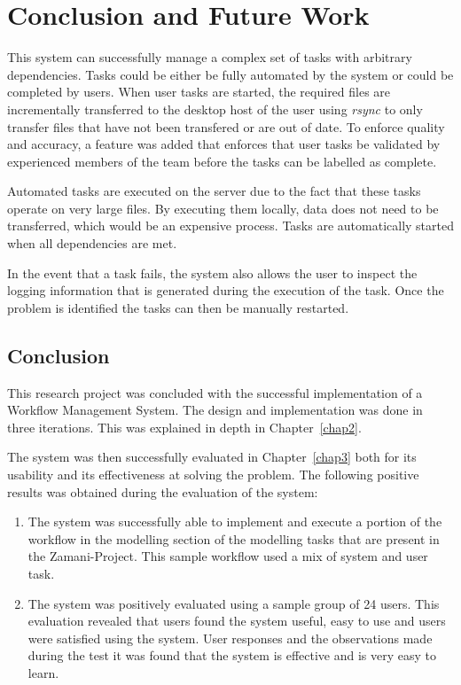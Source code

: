 \chapter{Conclusion and Future Work\label{chap4}}

This system can successfully manage a complex set
of tasks with arbitrary dependencies. Tasks could be either be fully automated
by the system or could be completed by users. When user tasks are started, the
required files are incrementally transferred to the desktop host of the user
using \emph{rsync} to only transfer files that have not been transfered or are
out of date. To enforce quality and accuracy, a feature was added that enforces
that user tasks be validated by experienced members of the team before the tasks
can be labelled as complete.

Automated tasks are executed on the
server due to the fact that these tasks operate on very large files. By executing
them locally, data does not need to be transferred, which would be an expensive
process. Tasks are automatically started when all dependencies are met.

In the event that a task fails, the system also allows the user to inspect the
logging information that is generated during the execution of the task. Once the
problem is identified the tasks can then be manually restarted.

\section{Conclusion}
This research project was concluded with the successful implementation of a
Workflow Management System.  The design and
implementation was done in three iterations. This was explained in depth in
Chapter~\ref{chap2}.


The system was then successfully evaluated in Chapter~\ref{chap3} both for its
usability and its effectiveness at solving the problem. The following positive
results was obtained during the evaluation of the system:
\begin{enumerate}
    \item The system was successfully able to implement and execute a portion of
        the workflow in the modelling section of the modelling tasks that are
        present in the Zamani-Project. This sample workflow used a mix of system
        and user task.
    \item The system was positively evaluated using a sample group of 24 users.
        This evaluation revealed that users found the system useful, easy to
        use and users were satisfied using the system. User responses and the
        observations made during the test it was found that the system is
        effective and is very easy to learn.
\end{enumerate}

